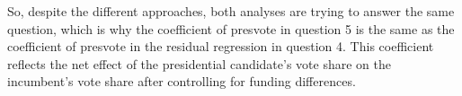 \documentclass[12pt,letterpaper]{article}
\begin{document}
\begin{enumerate}
        	So, despite the different approaches, both analyses are trying to answer the same question, which is why the coefficient of presvote in question 5 is the same as the coefficient of presvote in the residual regression in question 4. This coefficient reflects the net effect of the presidential candidate's vote share on the incumbent's vote share after controlling for funding differences.\\
	\end{enumerate}
\end{document}
